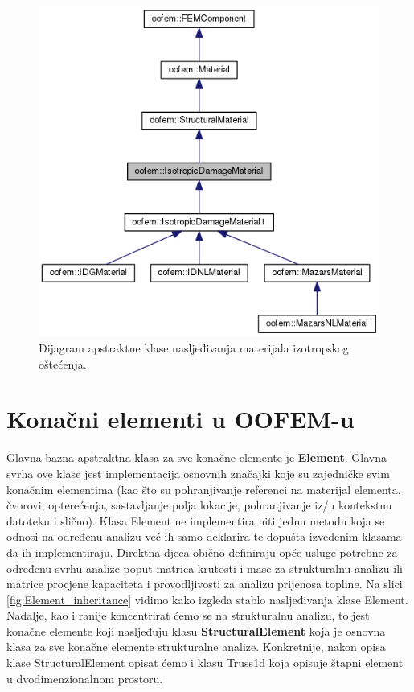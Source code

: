 \documentclass[a4paper,twoside,12pt]{memoir} %
\begin{document}
\begin{figure}[h!t]
\begin{center}
\includegraphics[scale=0.4]{pictures/chapter_oofem/IsotropicDamageMaterial_inheritance.png}
\caption{Dijagram apstraktne klase nasljeđivanja materijala izotropskog oštećenja. \cite{oofem_reference}}
\label{fig:IsotropicDamageMaterial_inheritance}
\end{center}
\end{figure}


\section{Konačni elementi u OOFEM-u}
\label{poglavlje:finite_elements_in_oofem}
Glavna bazna apstraktna klasa za sve konačne elemente je \textbf{Element}. Glavna svrha ove klase jest implementacija osnovnih značajki koje su zajedničke svim konačnim elementima (kao što su pohranjivanje referenci na materijal elementa, čvorovi, opterećenja, sastavljanje polja lokacije, pohranjivanje iz/u kontekstnu datoteku i slično). Klasa Element ne implementira niti jednu metodu koja se odnosi na određenu analizu već ih samo deklarira te dopušta izvedenim klasama da ih implementiraju. Direktna djeca obično definiraju opće usluge potrebne za određenu svrhu analize poput matrica krutosti i mase za strukturalnu analizu ili matrice procjene kapaciteta i provodljivosti za analizu prijenosa topline. Na slici \ref{fig:Element_inheritance} vidimo kako izgleda stablo nasljeđivanja klase Element. Nadalje, kao i ranije koncentrirat ćemo se na strukturalnu analizu, to jest konačne elemente koji nasljeđuju klasu \textbf{StructuralElement} koja je osnovna klasa za sve konačne elemente strukturalne analize. Konkretnije, nakon opisa klase StructuralElement opisat ćemo i klasu Truss1d koja opisuje štapni element u dvodimenzionalnom prostoru. \par
\end{document}
